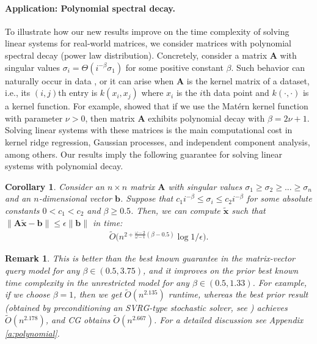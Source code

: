 \documentclass[11pt]{article}
\def\x{{\mathbf x}}
\def\b{{\mathbf b}}
\def\A{{\mathbf A}}
\newtheorem{cor}[thm]{Corollary}
\newtheorem{remark}[thm]{Remark}
\begin{document}
\paragraph{Application: Polynomial spectral decay.}
To illustrate how our new results improve on the time complexity of solving linear systems for real-world matrices, we consider matrices with polynomial spectral decay (power law distribution). Concretely, consider a matrix $\A$ with singular values $\sigma_i = \Theta(i^{-\beta}\sigma_1)$ for some positive constant $\beta$. Such behavior can naturally occur in data \cite{clauset2009power,eikmeier2017revisiting}, or it can arise when $\A$ is the kernel matrix of a dataset, i.e., its $(i,j)$th entry is $k(x_i,x_j)$ where $x_i$ is the $i$th data point and $k(\cdot,\cdot)$ is a kernel function. For example, \cite{RasmussenWilliams06} showed that if we use the Mat\'ern kernel function with parameter $\nu>0$, then matrix $\A$ exhibits polynomial decay with $\beta = 2\nu+1$. Solving linear systems with these matrices is the main computational cost in kernel ridge regression, Gaussian processes, and independent component analysis, among others.
Our results imply the following guarantee for solving linear systems with polynomial decay. 
\begin{cor}\label{c:polynomial}
Consider an $n\times n$ matrix $\A$ with singular values $\sigma_1\geq \sigma_2\geq ...\geq \sigma_n$ and an $n$-dimensional vector $\b$. Suppose that $c_1i^{-\beta}\leq \sigma_i\leq c_2i^{-\beta}$ for some absolute constants $0<c_1<c_2$ and $\beta\geq 0.5$. Then, we can compute $\tilde\x$ such that $\|\A\tilde\x-\b\|\leq\epsilon\|\b\|$ in time:
\begin{align*}
    \tilde O\Big(n^{2+\frac{\omega-2}{\omega-1}(\beta-0.5)}\log1/\epsilon\Big).
\end{align*}
\end{cor}
\begin{remark}
This is better than the best known guarantee in the matrix-vector query model \cite{sw09} for any $\beta\in(0.5, 3.75)$, 
and it improves on the prior best known time complexity in the unrestricted model for any $\beta\in(0.5,1.33)$. For example, if we choose $\beta=1$, then we get $\tilde O(n^{2.135})$ runtime, whereas the best prior result (obtained by preconditioning an SVRG-type stochastic solver, see \cite{gonen2016solving,musco2018spectrum}) achieves $\tilde O(n^{2.178})$, and CG obtains $\tilde O(n^{2.667})$. For a detailed discussion see Appendix \ref{a:polynomial}.
\end{remark}
\end{document}
